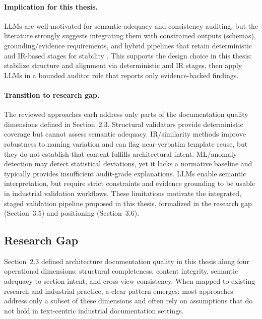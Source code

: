 \paragraph{Implication for this thesis.}
LLMs are well-motivated for semantic adequacy and consistency auditing, but the literature strongly suggests integrating them with constrained outputs (schemas), grounding/evidence requirements, and hybrid pipelines that retain deterministic and IR-based stages for stability \cite{llm4se_slr,ardoco_icsa23_inconsistency_detection}. This supports the design choice in this thesis: stabilize structure and alignment via deterministic and IR stages, then apply LLMs in a bounded auditor role that reports only evidence-backed findings.

\paragraph{Transition to research gap.}
The reviewed approaches each address only parts of the documentation quality dimensions defined in Section~2.3. Structural validators provide deterministic coverage but cannot assess semantic adequacy. IR/similarity methods improve robustness to naming variation and can flag near-verbatim template reuse, but they do not establish that content fulfills architectural intent. ML/anomaly detection may detect statistical deviations, yet it lacks a normative baseline and typically provides insufficient audit-grade explanations. LLMs enable semantic interpretation, but require strict constraints and evidence grounding to be usable in industrial validation workflows. These limitations motivate the integrated, staged validation pipeline proposed in this thesis, formalized in the research gap (Section~3.5) and positioning (Section~3.6).
\subsection{Research Gap}
Section~2.3 defined architecture documentation quality in this thesis along four operational dimensions: structural completeness, content integrity, semantic adequacy to section intent, and cross-view consistency. When mapped to existing research and industrial practice, a clear pattern emerges: most approaches address only a subset of these dimensions and often rely on assumptions that do not hold in text-centric industrial documentation settings.

